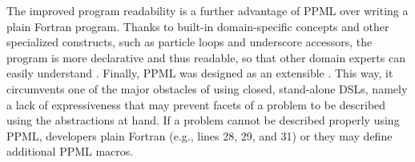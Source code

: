 The improved program readability is a further advantage of PPML over writing a plain Fortran program. Thanks to built-in domain-specific concepts and other specialized constructs, such as
particle loops and underscore accessors, the program is more declarative and thus  readable, so that other domain experts can easily understand .
%
Finally, PPML was designed as an extensible . This way, it circumvents one of the major 
obstacles of using closed, stand-alone DSLs, namely a lack of expressiveness that may prevent facets of a problem to be described using the abstractions at hand. If a problem cannot be described properly using PPML, developers  plain Fortran (e.g., lines 28, 29, and 31) or they may define additional PPML macros.
%

